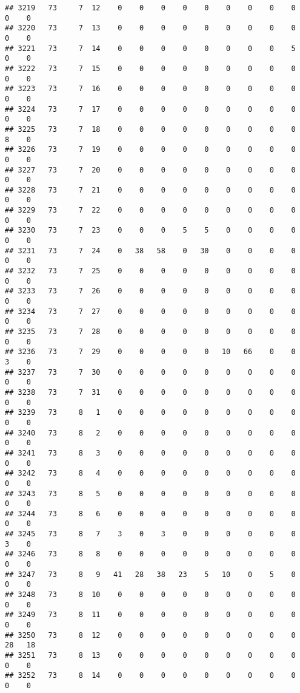 \documentclass[]{article}
\begin{document}
\begin{verbatim}
## 3219   73     7  12    0    0    0    0    0    0    0    0    0    0    0
## 3220   73     7  13    0    0    0    0    0    0    0    0    0    0    0
## 3221   73     7  14    0    0    0    0    0    0    0    0    5    0    0
## 3222   73     7  15    0    0    0    0    0    0    0    0    0    0    0
## 3223   73     7  16    0    0    0    0    0    0    0    0    0    0    0
## 3224   73     7  17    0    0    0    0    0    0    0    0    0    0    0
## 3225   73     7  18    0    0    0    0    0    0    0    0    0    8    0
## 3226   73     7  19    0    0    0    0    0    0    0    0    0    0    0
## 3227   73     7  20    0    0    0    0    0    0    0    0    0    0    0
## 3228   73     7  21    0    0    0    0    0    0    0    0    0    0    0
## 3229   73     7  22    0    0    0    0    0    0    0    0    0    0    0
## 3230   73     7  23    0    0    0    5    5    0    0    0    0    0    0
## 3231   73     7  24    0   38   58    0   30    0    0    0    0    0    0
## 3232   73     7  25    0    0    0    0    0    0    0    0    0    0    0
## 3233   73     7  26    0    0    0    0    0    0    0    0    0    0    0
## 3234   73     7  27    0    0    0    0    0    0    0    0    0    0    0
## 3235   73     7  28    0    0    0    0    0    0    0    0    0    0    0
## 3236   73     7  29    0    0    0    0    0   10   66    0    0    3    0
## 3237   73     7  30    0    0    0    0    0    0    0    0    0    0    0
## 3238   73     7  31    0    0    0    0    0    0    0    0    0    0    0
## 3239   73     8   1    0    0    0    0    0    0    0    0    0    0    0
## 3240   73     8   2    0    0    0    0    0    0    0    0    0    0    0
## 3241   73     8   3    0    0    0    0    0    0    0    0    0    0    0
## 3242   73     8   4    0    0    0    0    0    0    0    0    0    0    0
## 3243   73     8   5    0    0    0    0    0    0    0    0    0    0    0
## 3244   73     8   6    0    0    0    0    0    0    0    0    0    0    0
## 3245   73     8   7    3    0    3    0    0    0    0    0    0    3    0
## 3246   73     8   8    0    0    0    0    0    0    0    0    0    0    0
## 3247   73     8   9   41   28   38   23    5   10    0    5    0    0    0
## 3248   73     8  10    0    0    0    0    0    0    0    0    0    0    0
## 3249   73     8  11    0    0    0    0    0    0    0    0    0    0    0
## 3250   73     8  12    0    0    0    0    0    0    0    0    0   28   18
## 3251   73     8  13    0    0    0    0    0    0    0    0    0    0    0
## 3252   73     8  14    0    0    0    0    0    0    0    0    0    0    0

\end{verbatim}
\end{document}
